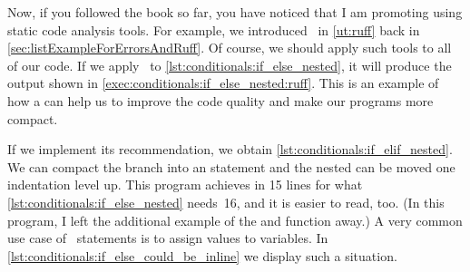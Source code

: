 Now, if you followed the book so far, you have noticed that I am promoting using static code analysis tools.
For example, we introduced \ruff\ in \cref{ut:ruff} back in \cref{sec:listExampleForErrorsAndRuff}.
Of course, we should apply such tools to all of our code.
If we apply \ruff\ to \cref{lst:conditionals:if_else_nested}, it will produce the output shown in \cref{exec:conditionals:if_else_nested:ruff}.
This is an example of how a  can help us to improve the code quality and make our programs more compact.

If we implement its recommendation, we obtain \cref{lst:conditionals:if_elif_nested}.
We can compact the  branch into an  statement and the nested  can be moved one indentation level up.
This program achieves in 15 lines for what \cref{lst:conditionals:if_else_nested} needs~16, and it is easier to read, too.
(In this program, I left the additional example of the  and  function away.)%
%
%
%
\FloatBarrier%
\endhsection%
%
%
\label{sec:inlineIfThenElse}%
%
%
%
%
%
%
%
%
%
%
A very common use case of ~statements is to assign values to variables.
In \cref{lst:conditionals:if_else_could_be_inline} we display such a situation.
